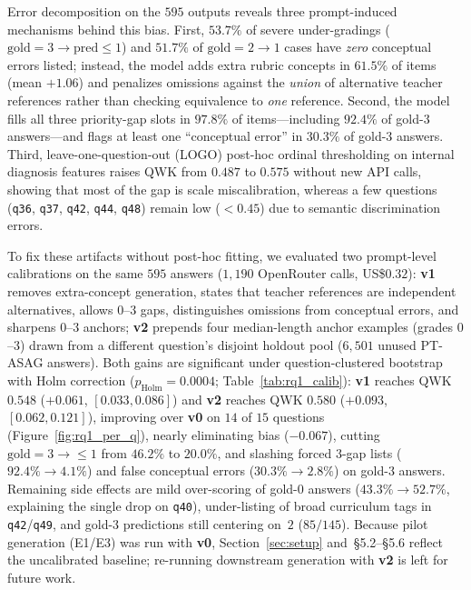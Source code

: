 Error decomposition on the $595$ outputs reveals three prompt-induced mechanisms behind this bias. First, $53.7\%$ of severe under-gradings ($\text{gold}{=}3 \to \text{pred}\le 1$) and $51.7\%$ of $\text{gold}{=}2 \to 1$ cases have \emph{zero} conceptual errors listed; instead, the model adds extra rubric concepts in $61.5\%$ of items (mean $+1.06$) and penalizes omissions against the \emph{union} of alternative teacher references rather than checking equivalence to \emph{one} reference. Second, the model fills all three priority-gap slots in $97.8\%$ of items---including $92.4\%$ of gold-$3$ answers---and flags at least one ``conceptual error'' in $30.3\%$ of gold-$3$ answers. Third, leave-one-question-out (LOGO) post-hoc ordinal thresholding on internal diagnosis features raises QWK from $0.487$ to $0.575$ without new API calls, showing that most of the gap is scale miscalibration, whereas a few questions (\texttt{q36}, \texttt{q37}, \texttt{q42}, \texttt{q44}, \texttt{q48}) remain low ($<0.45$) due to semantic discrimination errors.

To fix these artifacts without post-hoc fitting, we evaluated two prompt-level calibrations on the same $595$ answers ($1{,}190$ OpenRouter calls, US\$$0.32$): \textbf{v1} removes extra-concept generation, states that teacher references are independent alternatives, allows $0$--$3$ gaps, distinguishes omissions from conceptual errors, and sharpens $0$--$3$ anchors; \textbf{v2} prepends four median-length anchor examples (grades $0$--$3$) drawn from a different question's disjoint holdout pool ($6{,}501$ unused PT-ASAG answers). Both gains are significant under question-clustered bootstrap with Holm correction ($p_{\text{Holm}}{=}0.0004$; Table~\ref{tab:rq1_calib}): \textbf{v1} reaches QWK $0.548$ ($+0.061$, $[0.033, 0.086]$) and \textbf{v2} reaches QWK $0.580$ ($+0.093$, $[0.062, 0.121]$), improving over \textbf{v0} on $14$ of $15$ questions (Figure~\ref{fig:rq1_per_q}), nearly eliminating bias ($-0.067$), cutting $\text{gold}{=}3 \to \le 1$ from $46.2\%$ to $20.0\%$, and slashing forced $3$-gap lists ($92.4\% \to 4.1\%$) and false conceptual errors ($30.3\% \to 2.8\%$) on gold-$3$ answers. Remaining side effects are mild over-scoring of gold-$0$ answers ($43.3\% \to 52.7\%$, explaining the single drop on \texttt{q40}), under-listing of broad curriculum tags in \texttt{q42}/\texttt{q49}, and gold-$3$ predictions still centering on~$2$ ($85/145$). Because pilot generation (E1/E3) was run with \textbf{v0}, Section~\ref{sec:setup} and~\S5.2--\S5.6 reflect the uncalibrated baseline; re-running downstream generation with \textbf{v2} is left for future work.

